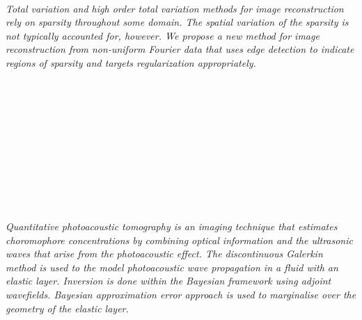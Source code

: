 \begin{multicols}{2}
\\ 
        \\
        \\\\
        \\
        \\\\
        \\
        \\\\
\\
      \textit{Total variation and high order total variation methods for image reconstruction rely on sparsity throughout some domain. The spatial variation of the sparsity is not typically accounted for, however. We propose a new method for image reconstruction from non-uniform Fourier data that uses edge detection to indicate regions of sparsity and targets regularization appropriately.}\\
\\ 
        \\
        \\\\
        \\
        \\\\
        \\
        \\\\
\\
      \textit{Quantitative photoacoustic tomography is an imaging technique that estimates choromophore concentrations by combining optical information and the ultrasonic waves that arise from the photoacoustic effect. The discontinuous Galerkin method is used to the model photoacoustic wave propagation in a fluid with an elastic layer. Inversion is done within the Bayesian framework using adjoint wavefields. Bayesian approximation error approach is used to marginalise over the geometry of the elastic layer.}\\
\\ 
        \\
        \\\\

\end{multicols}
